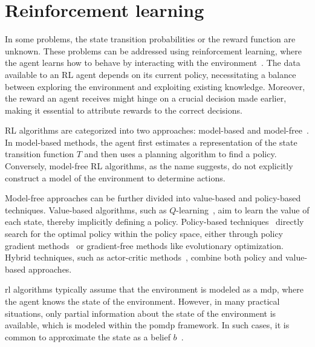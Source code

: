 \section{Reinforcement learning}
In some problems, the state transition probabilities or the reward function are unknown. These problems can be addressed using reinforcement learning, where the agent learns how to behave by interacting with the environment~\cite[Ch. 5]{Kochenderfer2015}. The data available to an RL agent depends on its current policy, necessitating a balance between exploring the environment and exploiting existing knowledge. Moreover, the reward an agent receives might hinge on a crucial decision made earlier, making it essential to attribute rewards to the correct decisions.

RL algorithms are categorized into two approaches: model-based and model-free~\cite[Ch. 5]{Kochenderfer2015}. In model-based methods, the agent first estimates a representation of the state transition function $T$ and then uses a planning algorithm to find a policy. Conversely, model-free RL algorithms, as the name suggests, do not explicitly construct a model of the environment to determine actions.

Model-free approaches can be further divided into value-based and policy-based techniques. Value-based algorithms, such as $Q$-learning~\cite{Watkins1992}, aim to learn the value of each state, thereby implicitly defining a policy. Policy-based techniques~\cite{sutton2018reinforcement} directly search for the optimal policy within the policy space, either through policy gradient methods~\cite{Williams2004} or gradient-free methods like evolutionary optimization. Hybrid techniques, such as actor-critic methods~\cite{Konda1999}, combine both policy and value-based approaches.

\gls{rl} algorithms typically assume that the environment is modeled as a \gls{mdp}, where the agent knows the state of the environment. However, in many practical situations, only partial information about the state of the environment is available, which is modeled within the \gls{pomdp} framework. In such cases, it is common to approximate the state as a belief $b$~\cite{Cassandra1997}. 


